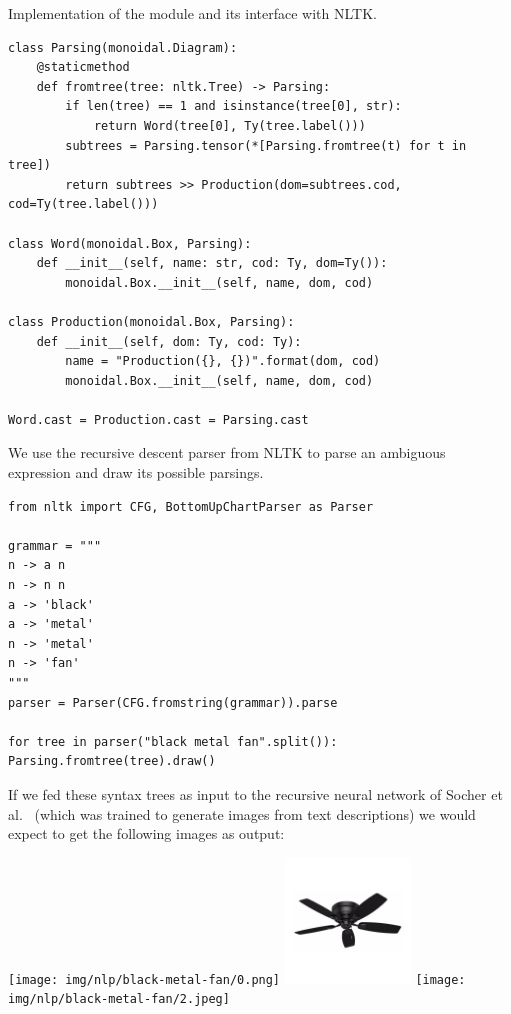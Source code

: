 \begin{python}
{\normalfont Implementation of the  module and its interface with NLTK.}

\begin{verbatim}
class Parsing(monoidal.Diagram):
    @staticmethod
    def fromtree(tree: nltk.Tree) -> Parsing:
        if len(tree) == 1 and isinstance(tree[0], str):
            return Word(tree[0], Ty(tree.label()))
        subtrees = Parsing.tensor(*[Parsing.fromtree(t) for t in tree])
        return subtrees >> Production(dom=subtrees.cod, cod=Ty(tree.label()))

class Word(monoidal.Box, Parsing):
    def __init__(self, name: str, cod: Ty, dom=Ty()):
        monoidal.Box.__init__(self, name, dom, cod)

class Production(monoidal.Box, Parsing):
    def __init__(self, dom: Ty, cod: Ty):
        name = "Production({}, {})".format(dom, cod)
        monoidal.Box.__init__(self, name, dom, cod)

Word.cast = Production.cast = Parsing.cast
\end{verbatim}
\end{python}

\begin{example}
We use the recursive descent parser from NLTK to parse an ambiguous expression and draw its possible parsings.

\begin{verbatim}
from nltk import CFG, BottomUpChartParser as Parser

grammar = """
n -> a n
n -> n n
a -> 'black'
a -> 'metal'
n -> 'metal'
n -> 'fan'
"""
parser = Parser(CFG.fromstring(grammar)).parse

for tree in parser("black metal fan".split()): Parsing.fromtree(tree).draw()
\end{verbatim}
\begin{center}
\hfill
{}
\hfill
{}
\end{center}
If we fed these syntax trees as input to the recursive neural network of Socher et al.~\cite{SocherEtAl11} (which was trained to generate images from text descriptions) we would expect to get the following images as output:
\begin{center}
\texttt{[image: img/nlp/black-metal-fan/0.png]}
\hfill
\includegraphics[width=0.25\textwidth]{img/nlp/black-metal-fan/1.jpeg}
\hfill
\texttt{[image: img/nlp/black-metal-fan/2.jpeg]}
\end{center}
\end{example}

